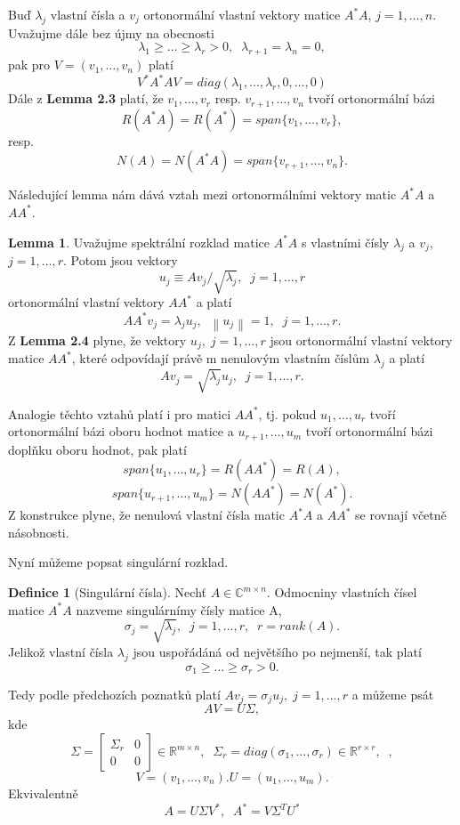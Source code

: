 \documentclass{article}
\theoremstyle{plain}
\theoremstyle{definition}
\newtheorem{definice}[veta]{Definice}
\newtheorem{lemma}[veta]{Lemma}
\begin{document}
Buď $\lambda_j$ vlastní čísla a $v_j$ ortonormální vlastní vektory matice $A^*A$, $j=1,\hdots,n.$ Uvažujme dále bez újmy na obecnosti 
$$\lambda_1 \geq \hdots \geq \lambda_r > 0,\;\; \lambda_{r+1}=\lambda_n=0,$$
pak pro $V=(v_1,\hdots,v_n)$ platí 
$$V^*A^*AV=diag(\lambda_1,\hdots,\lambda_r,0,\hdots,0)$$
Dále z \textbf{Lemma 2.3} platí, že $v_1,\hdots,v_r$ resp. $v_{r+1},\hdots,v_n$ tvoří ortonormální bázi
$$R(A^*A)=R(A^*)=span\{v_1,\hdots,v_r\},$$resp. $$N(A)=N(A^*A)=span\{v_{r+1},\hdots,v_n\}.$$

Následující lemma nám dává vztah mezi ortonormálními vektory matic $A^*A$ a $AA^*$.
\begin{lemma}
Uvažujme spektrální rozklad matice $A^*A$ s vlastními čísly $\lambda_j$ a $v_j$, $j=1,\hdots,r.$ Potom jsou vektory
$$u_j \equiv Av_j/\sqrt{\lambda_j},\;\;j=1,\hdots,r$$
ortonormální vlastní vektory $AA^*$ a platí
$$AA^*v_j=\lambda_j u_j,\;\; \left \lVert u_j \right \rVert = 1,\;\; j=1,\hdots,r. $$
Z \textbf{Lemma 2.4} plyne, že vektory $u_j,\;j=1,\hdots,r$ jsou ortonormální vlastní vektory matice $AA^*$, které odpovídají právě m nenulovým vlastním číslům $\lambda_j$ a platí 
$$Av_j=\sqrt{\lambda_j}u_j,\;\;j=1,\hdots,r.$$

Analogie těchto vztahů platí i pro matici $AA^*$, tj. pokud $u_1,\hdots,u_r$ tvoří ortonormální bázi oboru hodnot matice a $u_{r+1},\hdots,u_m$ tvoří ortonormální bázi doplňku oboru hodnot, pak platí
$$span\{u_1,\hdots,u_r\}=R(AA^*)=R(A),$$
$$span\{u_{r+1},\hdots,u_m\}=N(AA^*)=N(A^*).$$
Z konstrukce plyne, že nenulová vlastní čísla matic $A^*A$ a $AA^*$ se rovnají včetně násobnosti.    
\end{lemma}

Nyní můžeme popsat singulární rozklad.
\begin{definice}[Singulární čísla]
Nechť $A\in\mathbb{C}^{m\times n}$. Odmocniny vlastních čísel matice $A^*A$ nazveme singulárnímy čísly matice A,
$$\sigma_j=\sqrt{\lambda_j}, \;\;j=1,\hdots,r,\;\;r=rank(A).$$
Jelikož vlastní čísla $\lambda_j$ jsou uspořádáná od největšího po nejmenší, tak platí
$$\sigma_1\geq\hdots\geq\sigma_r>0.$$ 
\end{definice}
Tedy podle předchozích poznatků platí $Av_j=\sigma_ju_j,\;j=1,\hdots,r$ a můžeme psát
$$AV=U\Sigma,$$
kde $$\Sigma=
    \begin{bmatrix}
    \Sigma_r & 0 \\
    0 & 0
    \end{bmatrix} \in \mathbb{R}^{m \times n},\;\; \Sigma_r=diag(\sigma_1,\hdots,\sigma_r)\in\mathbb{R}^{r\times r},\;\;,$$
    $$V=(v_1,\hdots,v_n). U=(u_1,\hdots,u_m).$$
Ekvivalentně
$$A=U\Sigma V^*,\;\;A^*=V\Sigma^TU^*$$
\end{document}
